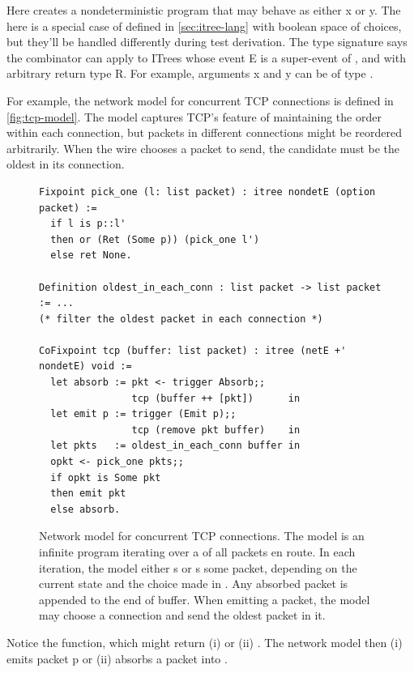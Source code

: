 Here  creates a nondeterministic program that may behave as either
\ilc x or \ilc y.  The  here is a special case of 
defined in \autoref{sec:itree-lang} with boolean space of choices, but they'll
be handled differently during test derivation.  The type signature  says the  combinator can apply to ITrees whose
event \ilc E is a super-event of , and with arbitrary return type
\ilc R.  For example, arguments \ilc x and \ilc y can be of type .

For example, the network model for concurrent TCP connections is defined in
\autoref{fig:tcp-model}.  The model captures TCP's feature of maintaining the
order within each connection, but packets in different connections might be
reordered arbitrarily.  When the wire chooses a packet to send, the candidate
must be the oldest in its connection.

\begin{figure}
\begin{lstlisting}[style=customcoq]
Fixpoint pick_one (l: list packet) : itree nondetE (option packet) :=
  if l is p::l'
  then or (Ret (Some p)) (pick_one l')
  else ret None.

Definition oldest_in_each_conn : list packet -> list packet := ...
(* filter the oldest packet in each connection *)

CoFixpoint tcp (buffer: list packet) : itree (netE +' nondetE) void :=
  let absorb := pkt <- trigger Absorb;;
                tcp (buffer ++ [pkt])      in
  let emit p := trigger (Emit p);;
                tcp (remove pkt buffer)    in
  let pkts   := oldest_in_each_conn buffer in
  opkt <- pick_one pkts;;
  if opkt is Some pkt
  then emit pkt
  else absorb.
\end{lstlisting}
\caption[Network model for concurrent TCP connections]{Network model for
  concurrent TCP connections.  The model is an infinite program iterating over a
   of all packets en route.  In each iteration, the model either
  s or s some packet, depending on the current
   state and the choice made in .  Any absorbed packet
  is appended to the end of buffer.  When emitting a packet, the model may
  choose a connection and send the oldest packet in it.}
\label{fig:tcp-model}
\end{figure}

Notice the  function, which might return (i)  or (ii)
.    The network model then
(i) emits packet \ilc p or (ii) absorbs a packet into .

